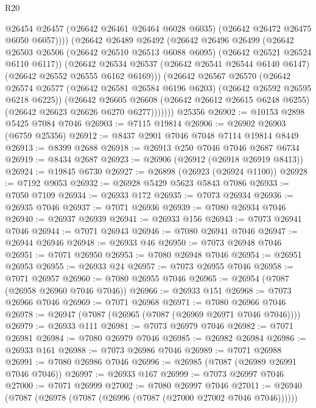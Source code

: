 \begin{lexlean}{R20}
\begin{coremodule}
{                @26454
                @26457
                (@26642 @26461 @26464 @6028 @6035)
                (@26642 @26472 @26475 @6050 @6057))))
          (@26642
            @26489
            @26492
            (@26642
              @26496
              @26499
              (@26642
                @26503
                @26506
                (@26642 @26510 @26513 @6088 @6095)
                (@26642 @26521 @26524 @6110 @6117))
              (@26642
                @26534
                @26537
                (@26642 @26541 @26544 @6140 @6147)
                (@26642 @26552 @26555 @6162 @6169)))
            (@26642
              @26567
              @26570
              (@26642
                @26574
                @26577
                (@26642 @26581 @26584 @6196 @6203)
                (@26642 @26592 @26595 @6218 @6225))
              (@26642
                @26605
                @26608
                (@26642 @26612 @26615 @6248 @6255)
                (@26642 @26623 @26626 @6270 @6277)))))))
    @25356
@26902 := @10153 @2898 @5425 @7084 @7046
@26903 := @7115 @19814
@26906 := @26902 @26903 (@6759 @25356)
@26912 := @8437 @2901 @7046 @7048 @7114 @19814 @8449
@26913 := @8399 @2688
@26918 := @26913 @250 @7046 @7046 @2687 @6734
@26919 := @8434 @2687
@26923 := @26906 (@26912 (@26918 @26919 @8413))
@26924 := @19845 @6730
@26927 := @26898 (@26923 (@26924 @1100))
@26928 := @7192 @9053
@26932 := @26928 @5429 @5623 @5843 @7086
@26933 := @7050 @7109
@26934 := @26933 @172
@26935 := @7073 @26934
@26936 := @26935 @7046
@26937 := @7071 @26936
@26939 := @7080 @26934 @7046
@26940 := @26937 @26939
@26941 := @26933 @156
@26943 := @7073 @26941 @7046
@26944 := @7071 @26943
@26946 := @7080 @26941 @7046
@26947 := @26944 @26946
@26948 := @26933 @46
@26950 := @7073 @26948 @7046
@26951 := @7071 @26950
@26953 := @7080 @26948 @7046
@26954 := @26951 @26953
@26955 := @26933 @24
@26957 := @7073 @26955 @7046
@26958 := @7071 @26957
@26960 := @7080 @26955 @7046
@26965 := @26954 (@7087 (@26958 @26960 @7046 @7046))
@26966 := @26933 @151
@26968 := @7073 @26966 @7046
@26969 := @7071 @26968
@26971 := @7080 @26966 @7046
@26978 := @26947 (@7087 (@26965 (@7087 (@26969 @26971 @7046 @7046))))
@26979 := @26933 @111
@26981 := @7073 @26979 @7046
@26982 := @7071 @26981
@26984 := @7080 @26979 @7046
@26985 := @26982 @26984
@26986 := @26933 @161
@26988 := @7073 @26986 @7046
@26989 := @7071 @26988
@26991 := @7080 @26986 @7046
@26996 := @26985 (@7087 (@26989 @26991 @7046 @7046))
@26997 := @26933 @167
@26999 := @7073 @26997 @7046
@27000 := @7071 @26999
@27002 := @7080 @26997 @7046
@27011 := @26940 (@7087 (@26978 (@7087 (@26996 (@7087 (@27000 @27002 @7046 @7046))))))
}
\end{coremodule}
\end{lexlean}
